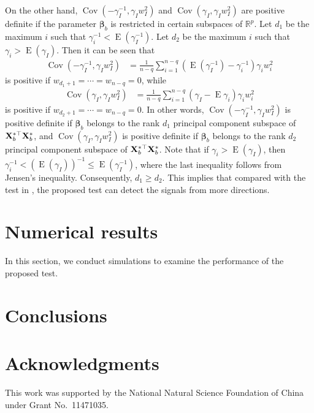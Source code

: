 \documentclass[11pt]{article}
\DeclareMathOperator{\myE}{E}
\DeclareMathOperator{\myCov}{Cov}
\newcommand{\bfsym}[1]{\ensuremath{\boldsymbol{#1}}}
\def\bbeta{\bfsym \beta}
\theoremstyle{plain}
\theoremstyle{definition}
\theoremstyle{remark}
\begin{document}
On the other hand, $\myCov (-\gamma_I^{-1}, \gamma_I w_I^2)$ and $\myCov(\gamma_I, \gamma_I w_I^2)$ are positive definite if the parameter $\bbeta_b$ is restricted  in certain subspaces of $\mathbb R^p$.
Let $d_1$ be the maximum $i$ such that $ \gamma_i^{-1} < \myE (\gamma_I^{-1})$.
Let $d_2$ be the maximum $i$ such that $\gamma_i > \myE (\gamma_I) $.
Then it can be seen that
\begin{align*}
\myCov (-\gamma_I^{-1}, \gamma_I w_I^2)
&=
\frac{1}{n-q} \sum_{i=1}^{n-q} \left(\myE (\gamma_I^{-1})-\gamma_i^{-1} \right) \gamma_i w_i^2
\end{align*}
is positive if $w_{d_1+1}=\cdots =w_{n-q}=0$, while
\begin{align*}
    \myCov(\gamma_I, \gamma_I w_I^2)
&=
\frac{1}{n-q} \sum_{i=1}^{n-q} \left(\gamma_I - \myE \gamma_i \right) \gamma_i w_i^2
\end{align*}
is positive if $w_{d_2 + 1}=\cdots = w_{n-q}=0$.
In other words, $\myCov(-\gamma_I^{-1}, \gamma_I w_I^2)$ is positive definite if $\bbeta_b$ belongs to the rank $d_1$ principal component subspace of $\mathbf{X}_{b}^{*\top}\mathbf{X}_b^{*}$, and $\myCov(\gamma_I, \gamma_I w_I^2)$ is positive definite if $\bbeta_b$ belongs to the rank $d_2$ principal component subspace of $\mathbf{X}_{b}^{*\top}\mathbf{X}_b^{*}$.
Note that if $\gamma_i > \myE (\gamma_I)$, then $\gamma_i^{-1} < (\myE (\gamma_I))^{-1}\leq \myE (\gamma_I^{-1})$, where the last inequality follows from Jensen's inequality.
Consequently, $ d_1 \geq d_2 $.
This implies that compared with the test in \cite{Goeman2006}, the proposed test can detect the signals from more directions.



\section{Numerical results}

In this section, we conduct simulations to examine the performance of the proposed test.





\section{Conclusions}


\section*{Acknowledgments}
This work was supported by the National Natural Science Foundation of China under Grant No.\ 11471035.
\end{document}
